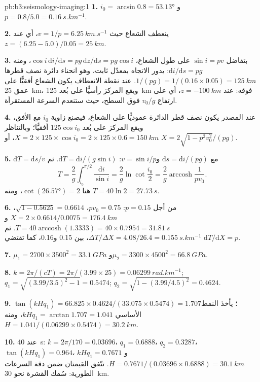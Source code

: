\begin{solution}{pb:b3:seismology-imaging:1}
\textbf{1.} $i_0 = \arcsin 0.8 = \ang{53.13}$ و$p = 0.8/5.0 =
\qty{0.16}{s.km^{-1}}$.

\textbf{2.} ينعطف الشعاع حيث $v = 1/p = \qty{6.25}{km.s^{-1}}$، أي عند
$z = (6.25 - 5.0)/0.05 = \qty{25}{km}$.

\textbf{3.} بتفاضل $\sin i = pv$ على طول الشعاع، $\cos i\,\mathrm di/
\mathrm ds = pg\,\mathrm dz/\mathrm ds = pg\cos i$، ومنه $\mathrm di/\mathrm ds =
pg$: يدور الاتجاه بمعدّل ثابت، وهو انحناء دائرة نصف قطرها
$1/(pg) = 1/(0.16\times0.05) = \qty{125}{km}$. عند نقطة الانعطاف يكون الشعاع
أفقيًّا على عمق \qty{25}{km}، ويقع المركز رأسيًّا على بُعد \qty{125}{km}
فوقه: عند $z = \qty{-100}{km}$، أي على ارتفاع $v_0/g$ فوق السطح، حيث
ستنعدم السرعة المستقرأة.

\textbf{4.} عند المصدر يكون نصف قطر الدائرة عموديًّا على الشعاع،
فيصنع زاوية $i_0$ مع الأفق، ويقع المركز
على بُعد $125\cos i_0$ أفقيًّا؛ وبالتناظر
$X = 2\times125\times\cos i_0 = 2\times125\times0.6 = \qty{150}{km}$، أو
$X = 2\sqrt{1 - p^2v_0^2}/(pg)$.

\textbf{5.} $\mathrm dT = \mathrm ds/v$ مع $\mathrm ds = \mathrm di/(pg)$
و$v = \sin i/p$: $\mathrm dT = \mathrm di/(g\sin i)$. ثم
\[
  T = \frac2g\int_{i_0}^{\pi/2}\frac{\mathrm di}{\sin i} = \frac2g\ln\cot\frac{i_0}2 =
  \frac2g\operatorname{arccosh}\frac1{pv_0} .
\]
هنا $\cot(\ang{26.57}) = 2$، ومنه
$T = 40\ln2 = \qty{27.73}{s}$.

\textbf{6.} من أجل $p = 0.15$: $pv_0 = 0.75$، $\sqrt{1 - 0.5625} = 0.6614$،
$X = 2\times0.6614/0.0075 = \qty{176.4}{km}$ و$T = 40\operatorname{arccosh}
(1.3333) = 40\times0.7954 = \qty{31.81}{s}$. ثم $\Delta T/\Delta X =
4.08/26.4 = \qty{0.155}{s.km^{-1}}$، بين 0.15 و0.16، كما
تقتضي $\mathrm dT/\mathrm dX = p$.

\textbf{7.} $\mu_1 = 2700\times3500^2 = \qty{33.1}{GPa}$
و$\mu_2 = 3300\times4500^2 = \qty{66.8}{GPa}$.

\textbf{8.} $k = 2\pi/(cT) = 2\pi/(3.99\times25) = \qty{0.06299}{rad.km^{-1}}$;
$q_1 = \sqrt{(3.99/3.5)^2 - 1} = 0.5474$; $q_2 = \sqrt{1 - (3.99/4.5)^2} = 0.4624$.

\textbf{9.} $\tan(kHq_1) = 66.825\times0.4624/(33.075\times0.5474) = 1.707$؛ يأخذ
النمط الأساسي $kHq_1 = \arctan1.707 = 1.041$، ومنه
$H = 1.041/(0.06299\times0.5474) = \qty{30.2}{km}$.

\textbf{10.} عند \qty{40}{s}: $k = 2\pi/170 = 0.03696$، $q_1 = 0.6888$،
$q_2 = 0.3287$، $\tan(kHq_1) = 0.964$، $kHq_1 = 0.7671$
و$H = 0.7671/(0.03696\times0.6888) = \qty{30.1}{km}$. تتّفق القيمتان ضمن
دقة السرعات الطورية: سُمك القشرة نحو \qty{30}{km}.


\end{solution}
